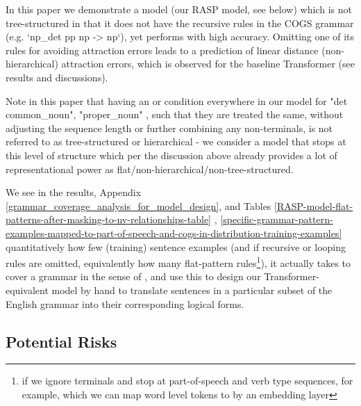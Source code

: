 \documentclass[11pt]{article}
\begin{document}
{\begin{footnotesize}
In this paper we demonstrate a model (our RASP model, see below) which is not tree-structured in that it does not have the recursive rules in the COGS grammar (e.g. `np\_det pp np -> np`), yet performs with high accuracy. Omitting one of its rules for avoiding attraction errors leads to a prediction of linear distance (non-hierarchical) attraction errors, which is observed for the baseline \cite{Wu2023} Transformer (see results and discussions).
\end{footnotesize}
}

Note in this paper that having an or condition everywhere in our model for "det common\_noun", "proper\_noun" , such that they are treated the same, without adjusting the sequence length or further combining any non-terminals, is not referred to as tree-structured or hierarchical - we consider a model that stops at this level of structure which per the discussion above already provides a lot of representational power as flat/non-hierarchical/non-tree-structured.

We see in the results, Appendix \ref{grammar_coverage_analysis_for_model_design}, and Tables \ref{RASP-model-flat-patterns-after-masking-to-nv-relationships-table} , \ref{specific-grammar-pattern-examples-mapped-to-part-of-speech-and-cogs-in-distribution-training-examples}  quantitatively how few (training) sentence examples (and if recursive or looping rules are omitted, equivalently how many flat-pattern rules\footnote{if we ignore terminals and stop at part-of-speech and verb type sequences, for example, which we can map word level tokens to by an embedding layer}), it actually takes to cover a grammar in the sense of \cite{fuzzingbook2023:GrammarCoverageFuzzer}, and use this to design our Transformer-equivalent model by hand to translate sentences in a particular subset of the English grammar into their corresponding logical forms.

\subsection{Potential Risks}
\label{potential_risks}
\end{document}
